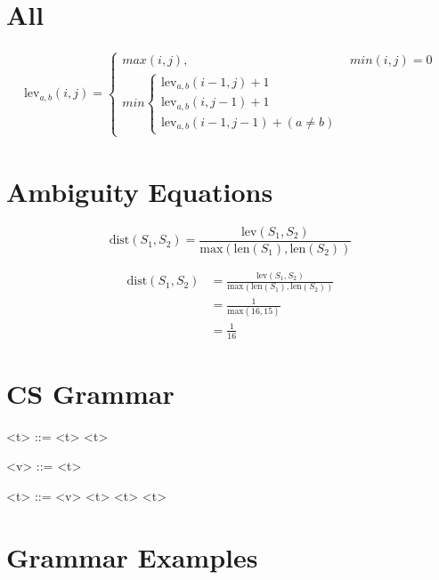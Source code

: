 \documentclass[11hpt]{article}
\begin{document}
\section{All}

\begin{align*}
  \text{lev}_{a,b}(i,j) =
  \begin{cases}
    max(i,j), &min(i,j) = 0 \\
    min
    \begin{cases}
      \text{lev}_{a,b}(i-1,j) + 1 \\
      \text{lev}_{a,b}(i,j-1) + 1 \\
      \text{lev}_{a,b}(i-1,j-1) + (a \neq b)
    \end{cases}
  \end{cases}
\end{align*}

\section{Ambiguity Equations}

\begin{equation*}
  \text{dist}(S_1, S_2) = \frac{\text{lev}(S_1, S_2)}{\text{max}(\text{len}(S_1), \text{len}(S_2))}
\end{equation*}

\begin{align*}
  \text{dist}(S_1, S_2) &= \frac{\text{lev}(S_1, S_2)}{\text{max}(\text{len}(S_1), \text{len}(S_2))} \\
               &= \frac{1}{\text{max}(16, 15)} \\
               &= \frac{1}{16}
\end{align*}

\section{CS Grammar}
\begin{grammar}
<\lambda t> ::= \lit*{() ->} <t>
  \alt \lit*{->} <t>

<v> ::= 
  \alt {}
  \alt <\lambda t>

<t> ::= <v>
  \alt <\lambda t>\lit*{()}
  \alt <t> <t>
\end{grammar}

\section{Grammar Examples}
\end{document}
